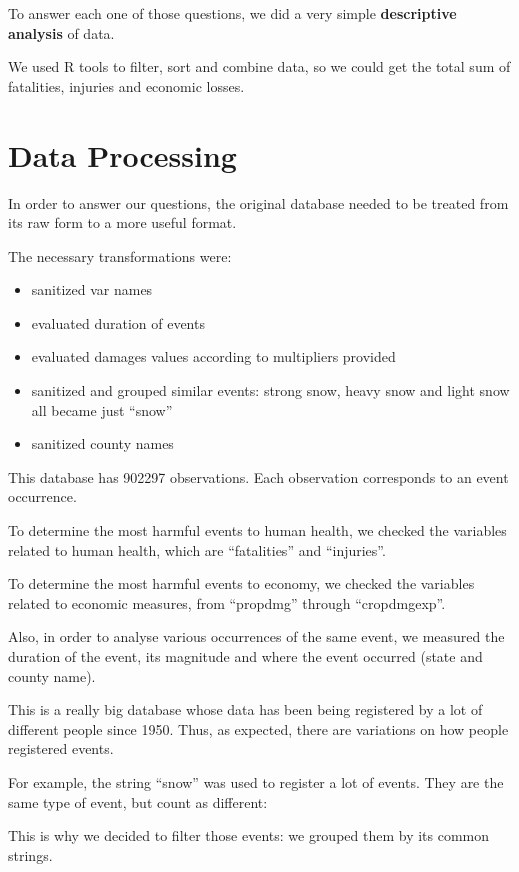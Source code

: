 To answer each one of those questions, we did a very simple
\textbf{descriptive analysis} of data.

We used R tools to filter, sort and combine data, so we could get the
total sum of fatalities, injuries and economic losses.

\section{Data Processing}\label{data-processing}

In order to answer our questions, the original database needed to be
treated from its raw form to a more useful format.

The necessary transformations were:

\begin{itemize}
\tightlist
\item
  sanitized var names
\item
  evaluated duration of events
\item
  evaluated damages values according to multipliers provided
\item
  sanitized and grouped similar events: strong snow, heavy snow and
  light snow all became just ``snow''
\item
  sanitized county names
\end{itemize}

This database has 902297 observations. Each observation corresponds to
an event occurrence.

To determine the most harmful events to human health, we checked the
variables related to human health, which are ``fatalities'' and
``injuries''.

To determine the most harmful events to economy, we checked the
variables related to economic measures, from ``propdmg'' through
``cropdmgexp''.

Also, in order to analyse various occurrences of the same event, we
measured the duration of the event, its magnitude and where the event
occurred (state and county name).

This is a really big database whose data has been being registered by a
lot of different people since 1950. Thus, as expected, there are
variations on how people registered events.

For example, the string ``snow'' was used to register a lot of events.
They are the same type of event, but count as different:

This is why we decided to filter those events: we grouped them by its
common strings.

